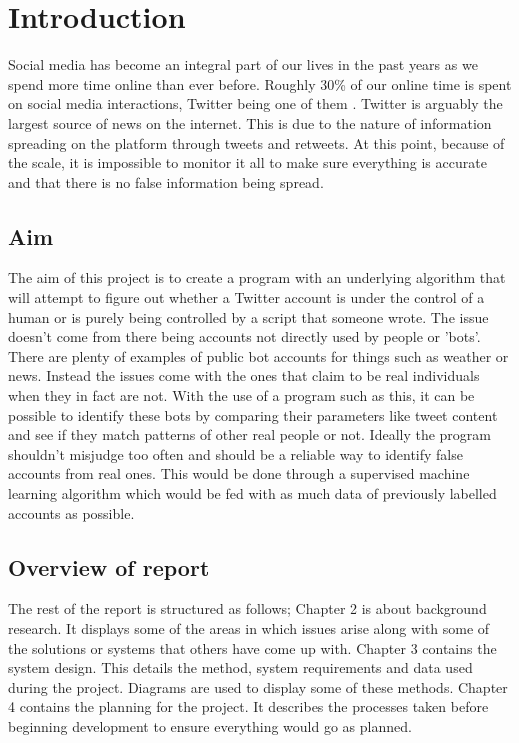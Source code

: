 
\chapter{Introduction} %

\label{Chapter1} %

Social media has become an integral part of our lives in the past years as we spend more time online than ever before. Roughly 30\% of our online time is spent on social media interactions, Twitter being one of them \cite{globalwebindex}.
Twitter is arguably the largest source of news on the internet. This is due to the nature of information spreading on the platform through tweets and retweets. At this point, because of the scale, it is impossible to monitor it all to make sure everything is accurate and that there is no false information being spread. 

\section{Aim}
The aim of this project is to create a program with an underlying algorithm that will attempt to figure out whether a Twitter account is under the control of a human or is purely being controlled by a script that someone wrote. The issue doesn't come from there being accounts not directly used by people or 'bots'. There are plenty of examples of public bot accounts for things such as weather or news. Instead the issues come with the ones that claim to be real individuals when they in fact are not. With the use of a program such as this, it can be possible to identify these bots by comparing their parameters like tweet content and see if they match patterns of other real people or not.
\newline
Ideally the program shouldn't misjudge too often and should be a reliable way to identify false accounts from real ones. This would be done through a supervised machine learning algorithm which would be fed with as much data of previously labelled accounts as possible.

\section{Overview of report}
The rest of the report is structured as follows;
\newline
Chapter 2 is about background research. It displays some of the areas in which issues arise along with some of the solutions or systems that others have come up with. 
\newline
Chapter 3 contains the system design. This details the method, system requirements and data used during the project. Diagrams are used to display some of these methods. 
\newline
Chapter 4 contains the planning for the project. It describes the processes taken before beginning development to ensure everything would go as planned. 